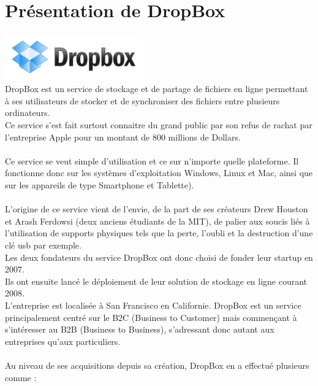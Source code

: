 \documentclass[a4paper, 10pt]{article}
\begin{document}
\section*{Pr\'esentation de DropBox}
\includegraphics[height = 2cm, width = 6cm]{jpg/dropbox_logo.png}\\
DropBox est un service de stockage et de partage de fichiers en ligne permettant \`a ses utilisateurs de stocker et
de synchroniser des fichiers entre plusieurs ordinateurs.\\
Ce service s'est fait surtout connaitre du grand public par son refus de rachat
par l'entreprise Apple pour un montant de 800 millions de Dollars.\\ \\
Ce service se veut simple d'utilisation et ce sur n'importe quelle plateforme.
Il fonctionne donc sur les syst\`emes d'exploitation Windows, Linux et Mac, ainsi que sur les appareils de type Smartphone et Tablette).\\ \\
L'origine de ce service vient de l'envie, de la part de ses cr\'eateurs Drew Houston et Arash Ferdowsi (deux anciens \'etudiants de la MIT),
de palier aux soucis li\'es \`a l'utilisation de supports physiques tels que la perte, l'oubli et la destruction d'une cl\'e usb par exemple.\\
Les deux fondateurs du service DropBox ont donc choisi de fonder leur startup en 2007.\\
Ils ont ensuite lanc\'e le d\'eploiement de leur solution de stockage en ligne courant 2008.\\
L'entreprise est localis\'ee \`a San Francisco en Californie.
\newpage
\noindent
DropBox est un service principalement centr\'e sur le B2C (Business to Customer) mais commençant \`a s'int\'eresser au B2B (Business to Business),
s'adressant donc autant aux entreprises qu'aux particuliers.\\ \\
Au niveau de ses acquisitions depuis sa cr\'eation, DropBox en a effectu\'e plusieurs comme :
\end{document}

